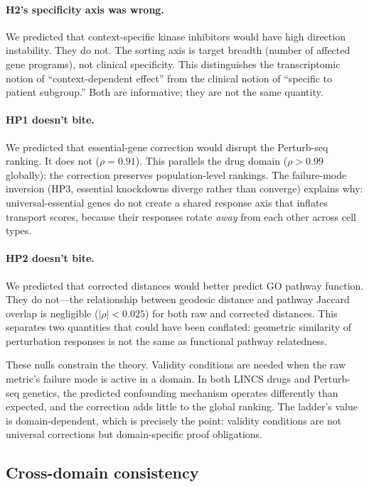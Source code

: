 \documentclass{article}
\begin{document}
\paragraph{H2's specificity axis was wrong.}
We predicted that context-specific kinase inhibitors would have high direction
instability. They do not. The sorting axis is target breadth (number of
affected gene programs), not clinical specificity. This distinguishes the
transcriptomic notion of ``context-dependent effect'' from the clinical notion
of ``specific to patient subgroup.'' Both are informative; they are not the
same quantity.

\paragraph{HP1 doesn't bite.}
We predicted that essential-gene correction would disrupt the Perturb-seq
ranking. It does not ($\rho = 0.91$). This parallels the drug domain ($\rho
> 0.99$ globally): the correction preserves population-level rankings. The
failure-mode inversion
(HP3, essential knockdowns diverge rather than converge) explains why:
universal-essential genes do not create a shared response axis that inflates
transport scores, because their responses rotate \emph{away} from each other
across cell types.

\paragraph{HP2 doesn't bite.}
We predicted that corrected distances would better predict GO pathway
function. They do not---the relationship between geodesic distance and
pathway Jaccard overlap is negligible ($|\rho| < 0.025$) for both raw and
corrected distances. This separates two quantities that could have been
conflated: geometric similarity of perturbation responses is not the same as
functional pathway relatedness.

These nulls constrain the theory. Validity conditions are needed when the raw
metric's failure mode is active in a domain. In both LINCS drugs and
Perturb-seq genetics, the predicted confounding mechanism operates differently
than expected, and the correction adds little to the global ranking. The
ladder's value is domain-dependent, which is precisely the point: validity
conditions are not universal corrections but domain-specific proof obligations.

\subsection{Cross-domain consistency}
\end{document}
